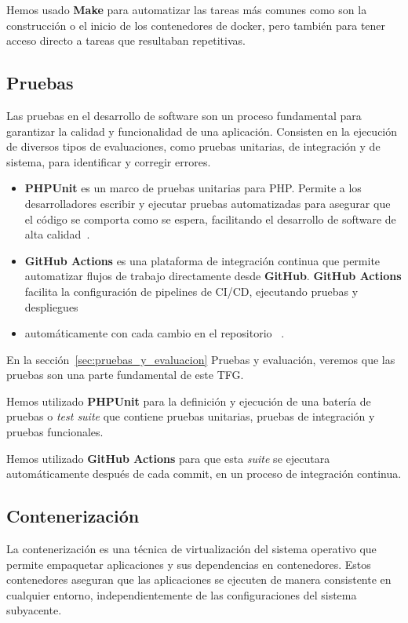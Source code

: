 Hemos usado \textbf{Make} para automatizar las tareas más comunes como son la construcción o el inicio de los
contenedores de docker, pero también para tener acceso directo a tareas que resultaban repetitivas.

\subsection*{Pruebas}

Las pruebas en el desarrollo de software son un proceso fundamental para garantizar la calidad y funcionalidad de una
aplicación.
Consisten en la ejecución de diversos tipos de evaluaciones, como pruebas unitarias, de integración y de sistema, para
identificar y corregir errores.

\begin{itemize}
    \item \textbf{PHPUnit} es un marco de pruebas unitarias para PHP. Permite a los desarrolladores escribir y
    ejecutar pruebas automatizadas para asegurar que el código se comporta como se espera, facilitando el desarrollo de
    software de alta calidad~\cite{url_phpunit}.
    \item \textbf{GitHub Actions} es una plataforma de integración continua que permite automatizar flujos de
    trabajo directamente desde \textbf{GitHub}.
    \textbf{GitHub Actions} facilita la configuración de pipelines de CI/CD, ejecutando pruebas y despliegues
    \item automáticamente con cada cambio en el repositorio ~\cite{url_github_actions}.
\end{itemize}

En la sección~\ref{sec:pruebas_y_evaluacion} Pruebas y evaluación, veremos que las pruebas son una parte fundamental
de este TFG.

Hemos utilizado \textbf{PHPUnit} para la definición y ejecución de una batería de pruebas o \textit{test suite} que
contiene pruebas unitarias, pruebas de integración y pruebas funcionales.

Hemos utilizado \textbf{GitHub Actions} para que esta \textit{suite} se ejecutara automáticamente después de cada
commit, en un proceso de integración continua.

\subsection*{Contenerización}

La contenerización es una técnica de virtualización del sistema operativo que permite empaquetar aplicaciones y
sus dependencias en contenedores.
Estos contenedores aseguran que las aplicaciones se ejecuten de manera consistente en cualquier entorno,
independientemente de las configuraciones del sistema subyacente.

